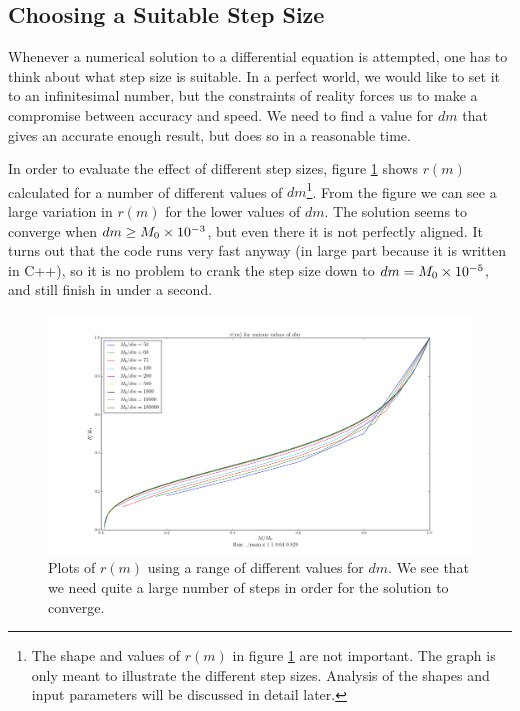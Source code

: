 \documentclass[11pt,twocolumn]{article}
\begin{document}
\subsection{Choosing a Suitable Step Size}
Whenever a numerical solution to a differential equation is attempted,
one has to think about what step size is suitable. In a perfect
world, we would like to set it to an infinitesimal number, but the
constraints of reality forces us to make a compromise between accuracy
and speed. We need to find a value for $dm$ that gives an accurate
enough result, but does so in a reasonable time. 

In order to evaluate the effect of different step sizes, figure
\ref{fig:dm-variation-no-dss} shows $r(m)$ calculated for a number of
different values of $dm$\footnote{The shape and values of $r(m)$ in
  figure \ref{fig:dm-variation-no-dss} are not important. The graph is
  only meant to illustrate the different step sizes. Analysis of the
  shapes and input parameters will be discussed in detail
  later.}. From the figure we can see a large variation in $r(m)$ for
the lower values of $dm$. The solution seems to converge when
$dm \geq M_0\times 10^{-3}$, but even there it is not perfectly aligned. It
turns out that the code runs very fast anyway (in large part because
it is written in C++), so it is no problem to crank the step size down
to $dm= M_0\times 10^{-5}$, and still finish in under a second.

\begin{figure}[ht]
  \centering
  \includegraphics[width=\linewidth]{fig/dm_variation_no_dss.png}
  \caption{\label{fig:dm-variation-no-dss} Plots of $r(m)$ using a
    range of different values for $dm$. We see that we need quite a
    large number of steps in order for the solution to converge.}
\end{figure}
\end{document}

